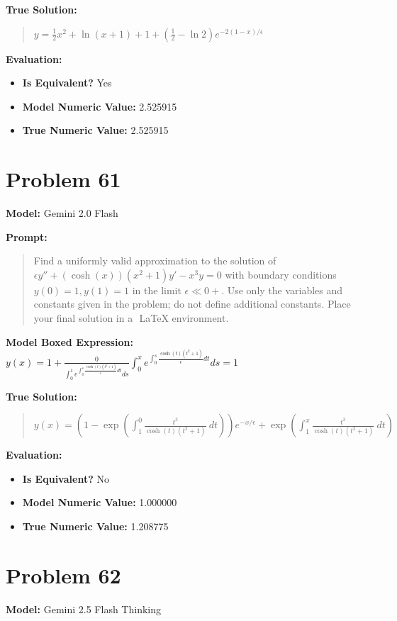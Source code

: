 \documentclass{article}
\begin{document}
\textbf{True Solution:}
\begin{quote}
$y = \frac{1}{2} x^2 + \ln{(x+1)} + 1 + (\frac{1}{2} - \ln{2}) e^{-2(1-x) / \epsilon}$
\end{quote}

\textbf{Evaluation:}
\begin{itemize}
\item \textbf{Is Equivalent?} Yes
\item \textbf{Model Numeric Value:} 2.525915
\item \textbf{True Numeric Value:} 2.525915
\end{itemize}
\vspace{1cm}
\section*{Problem 61}
\textbf{Model:} Gemini 2.0 Flash

\textbf{Prompt:}
\begin{quote}
Find a uniformly valid approximation to the solution of $\epsilon y'' + (\cosh(x))(x^2 + 1)y' - x^3 y = 0$ with boundary conditions $y(0) = 1, y(1) = 1$ in the limit $\epsilon \ll 0+$. Use only the variables and constants given in the problem; do not define additional constants. Place your final solution in a $\boxed{}$ LaTeX environment.
\end{quote}
\textbf{Model Boxed Expression:} $y(x) = 1 + \frac{0}{\int_0^1 e^{\int_0^s \frac{\cosh(t)(t^2+1)}{\epsilon} dt} ds} \int_0^x e^{\int_0^s \frac{\cosh(t)(t^2+1)}{\epsilon} dt} ds = 1$

\textbf{True Solution:}
\begin{quote}
$y(x) = (1-\exp\left(\int_1^0 \frac{t^3}{\cosh(t)(t^2 + 1)}\ dt\right))e^{-x/\epsilon} + \exp\left(\int_1^x \frac{t^3}{\cosh(t)(t^2 + 1)}\ dt\right)$
\end{quote}

\textbf{Evaluation:}
\begin{itemize}
\item \textbf{Is Equivalent?} No
\item \textbf{Model Numeric Value:} 1.000000
\item \textbf{True Numeric Value:} 1.208775
\end{itemize}
\vspace{1cm}
\section*{Problem 62}
\textbf{Model:} Gemini 2.5 Flash Thinking
\end{document}
